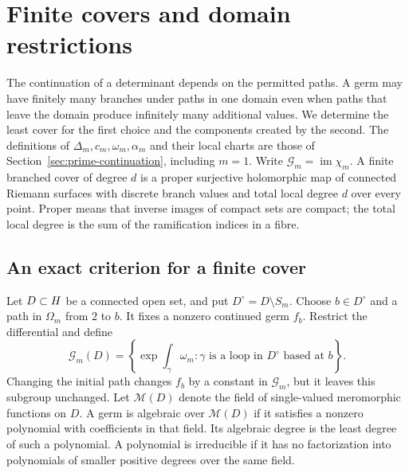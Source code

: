 \section{Finite covers and domain restrictions}
\label{sec:finite-covers}

The continuation of a determinant depends on the permitted paths.
A germ may have finitely many branches under paths in one domain even
when paths that leave the domain produce infinitely many additional values.
We determine the least cover for the first choice and the components
created by the second.  The definitions of \(\Delta_m,c_m,\omega_m,\alpha_m\)
and their local charts are those of Section~\ref{sec:prime-continuation},
including \(m=1\).  Write \(\mathcal G_m=\operatorname{im}\chi_m\).
A finite branched cover of degree \(d\) is a proper surjective holomorphic
map of connected Riemann surfaces with discrete branch values and total
local degree \(d\) over every point.  Proper means that inverse images
of compact sets are compact; the total local degree is the sum of the
ramification indices in a fibre.

\subsection{An exact criterion for a finite cover}

Let \(D\subset H\) be a connected open set, and put
\(D^\circ=D\setminus S_m\).
Choose \(b\in D^\circ\) and a path in \(\Omega_m\) from \(2\) to \(b\).
It fixes a nonzero continued germ \(f_b\).
Restrict the differential and define
\[
 \mathcal G_m(D)=\left\{\exp\int_\gamma\omega_m:
       \gamma\text{ is a loop in }D^\circ\text{ based at }b\right\}.
\]
Changing the initial path changes \(f_b\) by a constant in \(\mathcal G_m\),
but it leaves this subgroup unchanged.
Let \(\mathcal M(D)\) denote the field of single-valued meromorphic
functions on \(D\).
A germ is algebraic over \(\mathcal M(D)\) if it satisfies a nonzero
polynomial with coefficients in that field.
Its algebraic degree is the least degree of such a polynomial.
A polynomial is irreducible if it has no factorization into polynomials
of smaller positive degrees over the same field.

